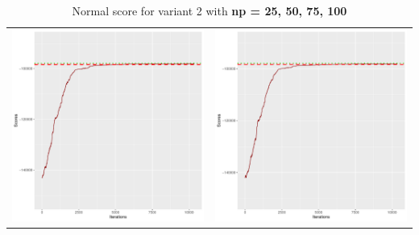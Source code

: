 \documentclass[]{scrartcl}
\begin{document}
\begin{table}[h!]
\begin{tabular}{cc}
\includegraphics[scale = 0.4]{./figs/hepar2/v2/75/boundsEvolution-10352.pdf} & 
\includegraphics[scale = 0.4]{./figs/hepar2/v2/100/boundsEvolution-10352.pdf} \\
\end{tabular}
\caption{Normal score for variant 2 with \textbf{np =  25, 50, 75, 100}}
\end{table}
\end{document}
